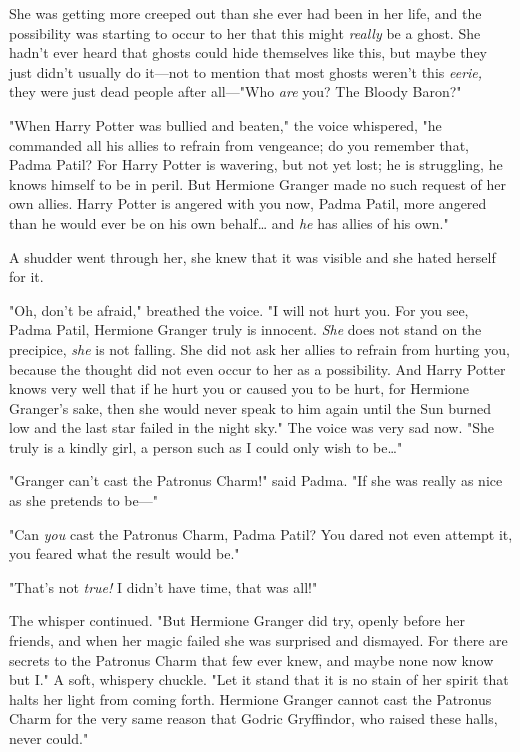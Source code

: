 She was getting more creeped out than she ever had been in her life, and the 
possibility was starting to occur to her that this might \emph{really} be a 
ghost. She hadn't ever heard that ghosts could hide themselves like this, but 
maybe they just didn't usually do it---not to mention that most ghosts weren't 
this \emph{eerie,} they were just dead people after all---"Who \emph{are} you? 
The Bloody Baron?"

"When Harry Potter was bullied and beaten," the voice whispered, "he commanded 
all his allies to refrain from vengeance; do you remember that, Padma Patil? 
For Harry Potter is wavering, but not yet lost; he is struggling, he knows 
himself to be in peril. But Hermione Granger made no such request of her own 
allies. Harry Potter is angered with you now, Padma Patil, more angered than he 
would ever be on his own behalf{\ldots} and \emph{he} has allies of his own."

A shudder went through her, she knew that it was visible and she hated herself 
for it.

"Oh, don't be afraid," breathed the voice. "I will not hurt you. For you see, 
Padma Patil, Hermione Granger truly is innocent. \emph{She} does not stand on 
the precipice, \emph{she} is not falling. She did not ask her allies to refrain 
from hurting you, because the thought did not even occur to her as a 
possibility. And Harry Potter knows very well that if he hurt you or caused you 
to be hurt, for Hermione Granger's sake, then she would never speak to him 
again until the Sun burned low and the last star failed in the night sky." The 
voice was very sad now. "She truly is a kindly girl, a person such as I could 
only wish to be{\ldots}"

"Granger can't cast the Patronus Charm!" said Padma. "If she was really as nice 
as she pretends to be---"

"Can \emph{you} cast the Patronus Charm, Padma Patil? You dared not even 
attempt it, you feared what the result would be."

"That's not \emph{true!} I didn't have time, that was all!"

The whisper continued. "But Hermione Granger did try, openly before her 
friends, and when her magic failed she was surprised and dismayed. For there 
are secrets to the Patronus Charm that few ever knew, and maybe none now know 
but I." A soft, whispery chuckle. "Let it stand that it is no stain of her 
spirit that halts her light from coming forth. Hermione Granger cannot cast the 
Patronus Charm for the very same reason that Godric Gryffindor, who raised 
these halls, never could."


